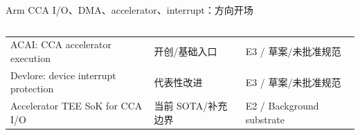 \begin{frame}[t,shrink=6]{Arm CCA I/O、DMA、accelerator、interrupt：方向开场}
\begin{columns}[T,totalwidth=\textwidth]
\begin{column}{0.49\textwidth}
{\begin{minipage}[t]{0.97\linewidth}
\begin{minipage}{0.92\linewidth}
{\begin{tabularx}{\linewidth}{@{}YYY@{}}
\midrule
ACAI: CCA accelerator execution & 开创/基础入口 & E3 / 草案/未批准规范 \\
Devlore: device interrupt protection & 代表性改进 & E3 / 草案/未批准规范 \\
Accelerator TEE SoK for CCA I/O & 当前 SOTA/补充边界 & E2 / Background substrate \\
\bottomrule
\end{tabularx}
}
    \end{minipage}
    \vspace{1mm}
  \end{minipage}}
  \end{column}
\end{columns}
\end{frame}


